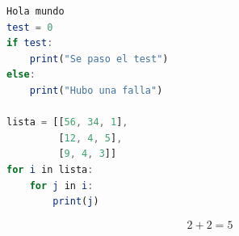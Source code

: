 \begin{table}[H]
  \centering
    \caption{Ejemplo}
  \label{tab:test}
\end{table}

\begin{lstlisting}[language=Octave,caption={Ejemplo}]
Hola mundo
test = 0
if test:
	print("Se paso el test")
else:
	print("Hubo una falla")
 
lista = [[56, 34, 1],
         [12, 4, 5],
         [9, 4, 3]]
for i in lista:
    for j in i:
        print(j)
\end{lstlisting}

\begin{equation}
    2 + 2 = 5
     \label{eq:test}
\end{equation}

